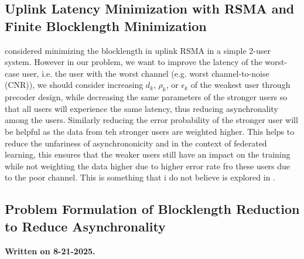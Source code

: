 \documentclass[a4paper, 12pt, onecolumn, journal, twoside, draftclsnofoot]{IEEEtran}
\begin{document}
\subsection{Uplink Latency Minimization with RSMA and Finite Blocklength Minimization}
\cite{zhang2023} considered minimizing the blocklength in uplink RSMA in a simple 2-user system. However in our problem, we want to improve the latency of the worst-case user, i.e. the user with the worst channel (e.g. worst channel-to-noise (CNR)), we should consider increasing $d_k$, $\rho_k$, or $\epsilon_k$ of the weakest user through precoder design, while decreasing the same parameters of the stronger users so that all users will experience the same latency, thus reducing asynchronality among the users.   
%
%
Similarly reducing the error probability of the stronger user will be helpful as the data from teh stronger users are weighted higher. This helps to reduce the unfariness of asynchrononicity and in the context of federated learning, this ensures that the weaker users still have an impact on the training while not weighting the data higher due to higher error rate fro these users due to the poor channel.  This is something that i do not believe is explored in \cite{zhang2023}.

\subsection{Problem Formulation of Blocklength Reduction to Reduce Asynchronality}
\textbf{Written  on 8-21-2025.} \\
\end{document}
